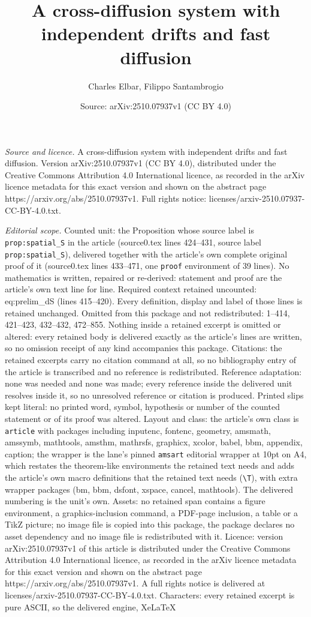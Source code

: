 \documentclass[10pt,a4paper]{amsart}
\title[A cross-diffusion system with independent drifts and fast di]{A cross-diffusion system with independent drifts and fast diffusion}
\author{Charles Elbar, Filippo Santambrogio}
\date{Source: arXiv:2510.07937v1 (CC BY 4.0)}
\begin{document}
\maketitle

\noindent\emph{Source and licence.} A cross-diffusion system with independent drifts and fast diffusion. Version arXiv:2510.07937v1 (CC BY 4.0), distributed under the Creative Commons Attribution 4.0 International licence, as recorded in the arXiv licence metadata for this exact version and shown on the abstract page https://arxiv.org/abs/2510.07937v1. Full rights notice: licenses/arxiv-2510.07937-CC-BY-4.0.txt.\par\smallskip

\noindent\textit{Editorial scope.} Counted unit: the Proposition whose source label is \texttt{prop:spatial\_S} in the article (source0.tex lines 424--431, source label \texttt{prop:spatial\_S}), delivered together with the article's own complete original proof of it (source0.tex lines 433--471, one \texttt{proof} environment of 39 lines). No mathematics is written, repaired or re-derived: statement and proof are the article's own text line for line. Required context retained uncounted: eq:prelim\_dS (lines 415--420). Every definition, display and label of those lines is retained unchanged. Omitted from this package and not redistributed: 1--414, 421--423, 432--432, 472--855. Nothing inside a retained excerpt is omitted or altered: every retained body is delivered exactly as the article's lines are written, so no omission receipt of any kind accompanies this package. Citations: the retained excerpts carry no citation command at all, so no bibliography entry of the article is transcribed and no reference is redistributed. Reference adaptation: none was needed and none was made; every reference inside the delivered unit resolves inside it, so no unresolved reference or citation is produced. Printed slips kept literal: no printed word, symbol, hypothesis or number of the counted statement or of its proof was altered. Layout and class: the article's own class is \texttt{article} with packages including inputenc, fontenc, geometry, amsmath, amssymb, mathtools, amsthm, mathrsfs, graphicx, xcolor, babel, bbm, appendix, caption; the wrapper is the lane's pinned \texttt{amsart} editorial wrapper at 10pt on A4, which restates the theorem-like environments the retained text needs and adds the article's own macro definitions that the retained text needs (\texttt{\textbackslash T}), with extra wrapper packages (bm, bbm, dsfont, xspace, cancel, mathtools). The delivered numbering is the unit's own. Assets: no retained span contains a figure environment, a graphics-inclusion command, a PDF-page inclusion, a table or a TikZ picture; no image file is copied into this package, the package declares no asset dependency and no image file is redistributed with it. Licence: version arXiv:2510.07937v1 of this article is distributed under the Creative Commons Attribution 4.0 International licence, as recorded in the arXiv licence metadata for this exact version and shown on the abstract page https://arxiv.org/abs/2510.07937v1. A full rights notice is delivered at licenses/arxiv-2510.07937-CC-BY-4.0.txt. Characters: every retained excerpt is pure ASCII, so the delivered engine, XeLaTeX 
\end{document}

